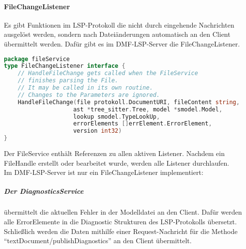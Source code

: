 \documentclass[./einleitung.tex]{subfiles}
\begin{document}
    \paragraph{FileChangeListener}
    Es gibt Funktionen im LSP-Protokoll die nicht durch eingehende Nachrichten ausgelöst werden, sondern nach Dateiänderungen automatisch an den Client übermittelt werden.
    Dafür gibt es im DMF-LSP-Server die FileChangeListener.
    \begin{lstlisting}[language=Go]
package fileService
type FileChangeListener interface {
	// HandleFileChange gets called when the FileService
    // finishes parsing the File.
    // It may be called in its own routine.
    // Changes to the Parameters are ignored.
	HandleFileChange(file protokoll.DocumentURI, fileContent string,
                    ast *tree_sitter.Tree, model *smodel.Model,
                    lookup smodel.TypeLookUp,
                    errorElements []errElement.ErrorElement,
                    version int32)
}
    \end{lstlisting}
    Der FileService enthält Referenzen zu allen aktiven Listener.
    Nachdem ein FileHandle erstellt oder bearbeitet wurde, werden alle Listener durchlaufen.\\
    Im DMF-LSP-Server ist nur ein FileChangeListener implementiert:
    \subparagraph{Der DiagnosticsService}
    übermittelt die aktuellen Fehler in der Modelldatei an den Client.
    Dafür werden alle ErrorElemente in die Diagnostic Strukturen des LSP-Protokolls übersetzt.
    Schließlich werden die Daten mithilfe einer Request-Nachricht für die Methode ``textDocument/publishDiagnostics'' an den Client übermittelt.
\end{document}

